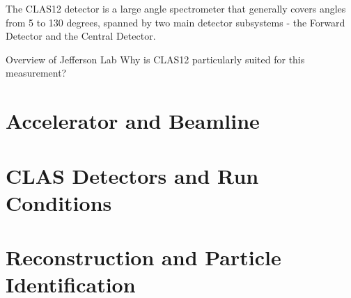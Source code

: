    The CLAS12 detector is a large angle spectrometer that generally covers angles from 5 to 130 degrees, spanned by two main detector subsystems - the Forward Detector and the Central Detector.

    Overview of Jefferson Lab
    Why is CLAS12 particularly suited for this measurement?

\section{Accelerator and Beamline}
                  

\section{CLAS Detectors and Run Conditions}\label{sec:clas12exp}
    


\section{Reconstruction and Particle Identification}
    
    






